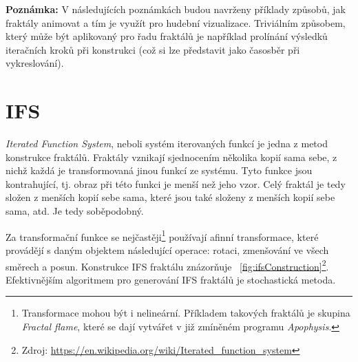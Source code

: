 \documentclass[thesis=B, czech]{FITthesis}[2019/03/06]
\newcommand{\note}[1]{\begin{noteBox} \textbf{Poznámka:} #1 \end{noteBox}}
\let\oldquote\quote
\let\endoldquote\endquote
\renewenvironment{quote}[2][]
  {\if\relax\detokenize{#1}\relax
     \def\quoteauthor{#2}%
   \else
     \def\quoteauthor{#2~---~#1}%
   \fi
   \oldquote}
  {\par\nobreak\smallskip\hfill(\quoteauthor)%
   \endoldquote\addvspace{\bigskipamount}}
\begin{document}
\note{V následujících poznámkách budou navrženy příklady způsobů, jak fraktály animovat a tím je využít pro hudební vizualizace. Triviálním způsobem, který může být aplikovaný pro řadu fraktálů je například prolínání výsledků iteračních kroků při konstrukci (což si lze představit jako časosběr při vykreslování).} 




\section{IFS}





\textit{Iterated Function System}, neboli systém iterovaných funkcí je jedna z metod konstrukce fraktálů. Fraktály vznikají sjednocením několika kopií sama sebe, z nichž každá je transformovaná jinou funkcí ze systému. Tyto funkce jsou kontrahující, tj. obraz při této funkci je menší než jeho vzor. Celý fraktál je tedy složen z menších kopií sebe sama, které jsou také složeny z menších kopií sebe sama, atd. Je tedy soběpodobný.

Za transformační funkce se nejčastěji\footnote{Transformace mohou být i nelineární. Příkladem takových fraktálů je skupina \textit{Fractal flame}, které se dají vytvářet v již zmíněném programu \textit{Apophysis}.} používají afinní transformace, které provádějí s daným objektem následující operace: rotaci, zmenšování ve všech směrech a posun. Konstrukce IFS fraktálu znázorňuje \figurename~\ref{fig:ifsConstruction}\footnote{Zdroj: \url{https://en.wikipedia.org/wiki/Iterated_function_system}}. Efektivnějším algoritmem pro generování IFS fraktálů je stochastická metoda.
\end{document}
